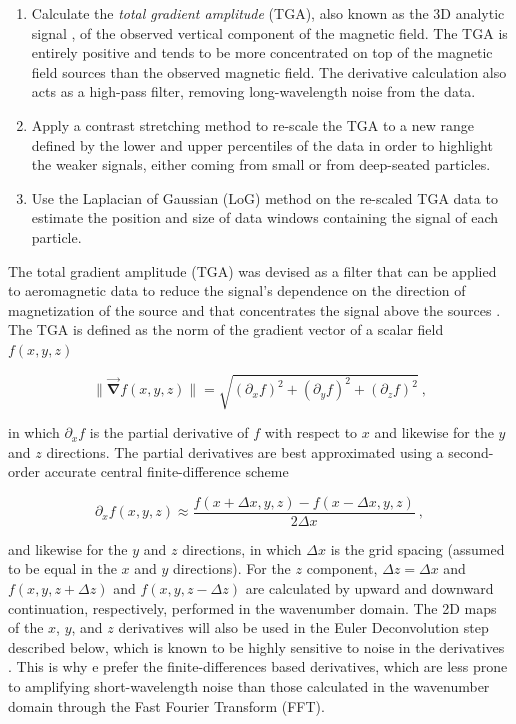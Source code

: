 \begin{enumerate}
\item Calculate the \textit{total gradient amplitude} (TGA), also known as the
  3D analytic signal \citep{Roest1992Magnetic}, of the observed vertical
  component of the magnetic field. The TGA is entirely positive and tends to be
  more concentrated on top of the magnetic field sources than the observed
  magnetic field. The derivative calculation also acts as a high-pass filter,
  removing long-wavelength noise from the data.
\item Apply a contrast stretching method to re-scale the TGA to a new range
  defined by the lower and upper percentiles of the data in order to highlight
  the weaker signals, either coming from small or from deep-seated particles.
\item Use the Laplacian of Gaussian (LoG) method \citep{Kong2013} on the
  re-scaled TGA data to estimate the position and size of data windows
  containing the signal of each particle.
\end{enumerate}

The total gradient amplitude (TGA) was devised as a filter that can be applied
to aeromagnetic data to reduce the signal's dependence on the direction of
magnetization of the source and that concentrates the signal above the sources
\citep{Roest1992Magnetic, Nabighian2005}. The TGA is defined as the norm of the
gradient vector of a scalar field $f(x, y, z)$

\begin{equation}
\|\vec{\mathbf{\nabla}}f(x, y, z)\|  =
\sqrt{(\partial_x f)^2 + (\partial_y f)^2 + (\partial_z f)^2}
\ ,
\end{equation}

\noindent
in which $\partial_x f$ is the partial derivative of $f$ with respect to $x$
and likewise for the $y$ and $z$ directions. The partial derivatives are best
approximated using a second-order accurate central finite-difference scheme

\begin{equation}
\partial_x f(x, y, z) \approx
\dfrac{f(x + \Delta x, y, z) - f(x - \Delta x, y, z)}{2 \Delta x}
\ ,
\end{equation}

\noindent
and likewise for the $y$ and $z$ directions, in which $\Delta x$ is the grid
spacing (assumed to be equal in the $x$ and $y$ directions). For the $z$
component, $\Delta z = \Delta x$ and $f(x, y, z + \Delta z)$ and
$f(x, y, z - \Delta z)$ are calculated by upward and downward continuation,
respectively, performed in the wavenumber domain. The 2D maps of the $x$, $y$,
and $z$ derivatives will also be used in the Euler Deconvolution step described
below, which is known to be highly sensitive to noise in the derivatives
\citep{Saleh2012Applying}. This is why e prefer the finite-differences based
derivatives, which are less prone to amplifying short-wavelength noise than
those calculated in the wavenumber domain through the Fast Fourier Transform
(FFT).

